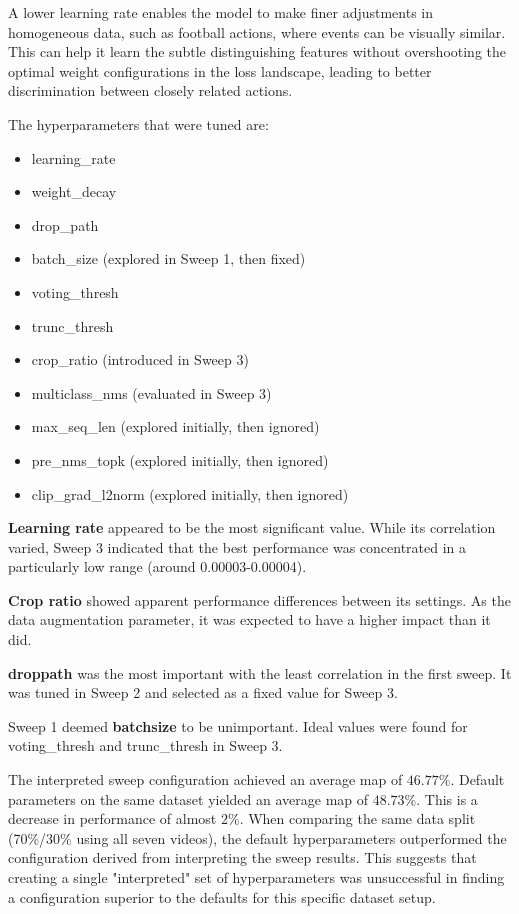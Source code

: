A lower learning rate enables the model to make finer adjustments in homogeneous data, such as football actions, where events can be visually similar. This can help it learn the subtle distinguishing features without overshooting the optimal weight configurations in the loss landscape, leading to better discrimination between closely related actions.


The hyperparameters that were tuned are:
\begin{itemize}
    \item learning\_rate
    \item weight\_decay
    \item drop\_path 
    \item batch\_size (explored in Sweep 1, then fixed)
    \item voting\_thresh
    \item trunc\_thresh
    \item crop\_ratio (introduced in Sweep 3)
    \item multiclass\_nms (evaluated in Sweep 3)
    \item max\_seq\_len (explored initially, then ignored)
    \item pre\_nms\_topk (explored initially, then ignored)
    \item clip\_grad\_l2norm (explored initially, then ignored)
\end{itemize}

\textbf{Learning rate} appeared to be the most significant value. While its correlation varied, Sweep 3 indicated that the best performance was concentrated in a particularly low range (around 0.00003-0.00004). 

\textbf{Crop ratio} showed apparent performance differences between its settings. As the data augmentation parameter, it was expected to have a higher impact than it did. 

\textbf{droppath} was the most important with the least correlation in the first sweep. It was tuned in Sweep 2 and selected as a fixed value for Sweep 3. 

Sweep 1 deemed \textbf{batchsize} to be unimportant. Ideal values were found for voting\_thresh and trunc\_thresh in Sweep 3. 

The interpreted sweep configuration achieved an average \acrshort{map} of $46.77\%$. Default parameters on the same dataset yielded an average \acrshort{map} of $48.73\%$. This is a decrease in performance of almost $2\%$. When comparing the same data split (70\%/30\% using all seven videos), the default hyperparameters outperformed the configuration derived from interpreting the sweep results. This suggests that creating a single "interpreted" set of hyperparameters was unsuccessful in finding a configuration superior to the defaults for this specific dataset setup.

